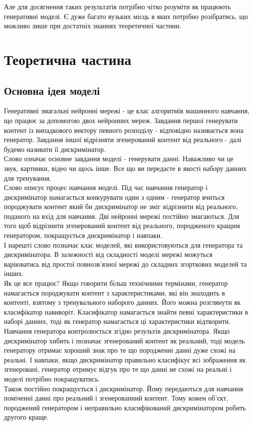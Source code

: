 \documentclass{article}
\begin{document}
	\null\quad Але для досягнення таких результатів потрібно чітко розуміти як працюють генеративні моделі. Є дуже багато вузьких місць в яких потрібно розібратись, що можливо лише при достатніх знаннях теоретичної частини.
	
	\section{Теоретична частина}
	\subsection{Основна ідея моделі}
	\null\quad Генеративні змагальні нейронні мережі - це клас алгоритмів машинного навчання, що працює за допомогою двох нейронних мереж. Завдання першої генерувати контент із випадкового вектору певного розподілу - відповідно називається вона генератор. Завдання іншої відрізняти згенерований контент від реального - далі будемо називати її дискримінатор. \\
	\null\quad Слово   означає основне завдання моделі - генерувати данні. Наважливо чи це звук, картинки, відео чи щось інше. Все що ви передасте в якості набору данних для тренування. \\
	\null\quad Слово  описує процес навчання моделі. Під час навчання генератор і дискримінатор намагається конкурувати один з одним - генератор вчиться породжувати контент який би дискримінатор не зміг відрізнити від реального, поданого на вхід для навчання. Дві нейронні мережі постійно змагаються. Для того щоб відрізнити згенерований контент від реального, породженого кращим генератором, покращується дискримінатор і навпаки. \\
	\null\quad І нарешті слово  позначає клас моделей, які використовуються для генератора та дискримінатора. В залежності від складності моделі мережі можуться варіюватись від простої повнозв'язної мережі до складних згорткових моделей та інших. \\
	\null\quad Як це все працює? Якщо говорити більш технічними термінами, генератор намагається породжувати контент з характеристиками, які він знаходить в контенті, взятому з тренувального наборого данних. Його можна розглянути як класифікатор навиворіт. Класифікатор намагається знайти певні характеристики в наборі данних, тоді як генератор намагається ці характеристики відтворити. \\
	\null\quad Навчання генератора контролюється згідно результів дискримінатора. Якщо дискримінатор хибить і позначає згенерований контент як реальний, тоді модель генератору отримає хороший знак про те що породженні данні дуже схожі на реальні. І навпаки, якщо дискримінатор правильно класифікує всі зображення як згенеровані, генератор отримує відгук про те що данні не схожі на реальні і моделі потрібно покращуватись. \\
	\null\quad Також постійно покращується і дискримінатор. Йому передаються для навчання поміченні данні про реальний і згенерованний контент.  Тому кожен об'єкт, породжений генератором і неправильно класифікований дискримінатором робить другого краще. \\
\end{document}
